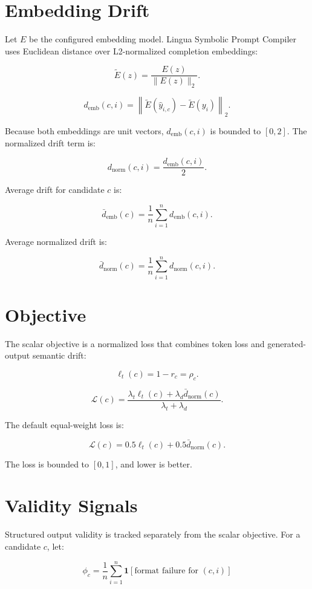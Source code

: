 \documentclass[11pt]{article}
\begin{document}
\section{Embedding Drift}

Let \(E\) be the configured embedding model. Lingua Symbolic Prompt Compiler uses
Euclidean distance over L2-normalized completion embeddings:

\[
\tilde{E}(z) = \frac{E(z)}{\lVert E(z) \rVert_2}.
\]

\[
d_{\mathrm{emb}}(c, i) =
\left\| \tilde{E}(\hat{y}_{i,c}) - \tilde{E}(y_i) \right\|_2.
\]

Because both embeddings are unit vectors, \(d_{\mathrm{emb}}(c, i)\) is bounded
to \([0, 2]\). The normalized drift term is:

\[
d_{\mathrm{norm}}(c, i) = \frac{d_{\mathrm{emb}}(c, i)}{2}.
\]

Average drift for candidate \(c\) is:

\[
\bar{d}_{\mathrm{emb}}(c) =
\frac{1}{n}\sum_{i=1}^{n} d_{\mathrm{emb}}(c, i).
\]

Average normalized drift is:

\[
\bar{d}_{\mathrm{norm}}(c) =
\frac{1}{n}\sum_{i=1}^{n} d_{\mathrm{norm}}(c, i).
\]

\section{Objective}

The scalar objective is a normalized loss that combines token loss and
generated-output semantic drift:

\[
\ell_t(c) = 1 - r_c = \rho_c.
\]

\[
\mathcal{L}(c) =
\frac{\lambda_t \ell_t(c) + \lambda_d \bar{d}_{\mathrm{norm}}(c)}
     {\lambda_t + \lambda_d}.
\]

The default equal-weight loss is:

\[
\mathcal{L}(c) =
0.5 \ell_t(c) + 0.5 \bar{d}_{\mathrm{norm}}(c).
\]

The loss is bounded to \([0, 1]\), and lower is better.

\section{Validity Signals}

Structured output validity is tracked separately from the scalar objective.
For a candidate \(c\), let:

\[
\phi_c =
\frac{1}{n}\sum_{i=1}^{n}\mathbf{1}[\text{format failure for }(c,i)]
\]
\end{document}
